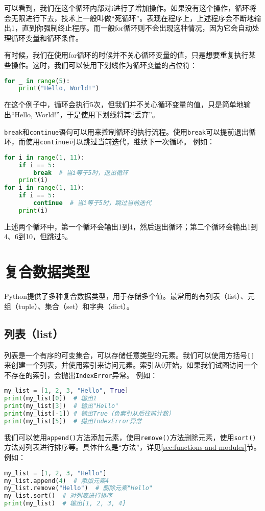 \documentclass[../main.tex]{subfiles}
\begin{document}
可以看到，我们在这个循环内部对i进行了增加操作。如果没有这个操作，循环将会无限进行下去，技术上一般叫做“死循环”。表现在程序上，上述程序会不断地输出1，直到你强制终止程序。而一般for循环则不会出现这种情况，因为它会自动处理循环变量和循环条件。

有时候，我们在使用for循环的时候并不关心循环变量的值，只是想要重复执行某些操作。这时，我们可以使用下划线作为循环变量的占位符：
\begin{lstlisting}[language=python]
for _ in range(5):
    print("Hello, World!")
\end{lstlisting}
在这个例子中，循环会执行5次，但我们并不关心循环变量的值，只是简单地输出“Hello, World!”，于是使用下划线将其“丢弃”。

\texttt{break}和\texttt{continue}语句可以用来控制循环的执行流程。使用\texttt{break}可以提前退出循环，而使用\texttt{continue}可以跳过当前迭代，继续下一次循环。
例如：
\begin{lstlisting}[language=python]
for i in range(1, 11):
    if i == 5:
        break  # 当i等于5时，退出循环
    print(i)
for i in range(1, 11):
    if i == 5:
        continue  # 当i等于5时，跳过当前迭代
    print(i)
\end{lstlisting}
上述两个循环中，第一个循环会输出1到4，然后退出循环；第二个循环会输出1到4、6到10，但跳过5。

\section{复合数据类型}

Python提供了多种复合数据类型，用于存储多个值。最常用的有列表（list）、元组（tuple）、集合（set）和字典（dict）。

\subsection{列表（list）}
列表是一个有序的可变集合，可以存储任意类型的元素。我们可以使用方括号\texttt{[]}来创建一个列表，并使用索引来访问元素。索引从0开始，如果我们试图访问一个不存在的索引，会抛出\texttt{IndexError}异常。
例如：
\begin{lstlisting}[language=python]
my_list = [1, 2, 3, "Hello", True]
print(my_list[0])  # 输出1
print(my_list[3])  # 输出"Hello"
print(my_list[-1]) # 输出True（负索引从后往前计数）
print(my_list[5])  # 抛出IndexError异常
\end{lstlisting}

我们可以使用\texttt{append()}方法添加元素，使用\texttt{remove()}方法删除元素，使用\texttt{sort()}方法对列表进行排序等。具体什么是“方法”，详见\ref{sec:functions-and-modules}节。
例如：
\begin{lstlisting}[language=python]
my_list = [1, 2, 3, "Hello"]
my_list.append(4)  # 添加元素4
my_list.remove("Hello")  # 删除元素"Hello" 
my_list.sort()  # 对列表进行排序
print(my_list)  # 输出[1, 2, 3, 4]
\end{lstlisting}
\end{document}
